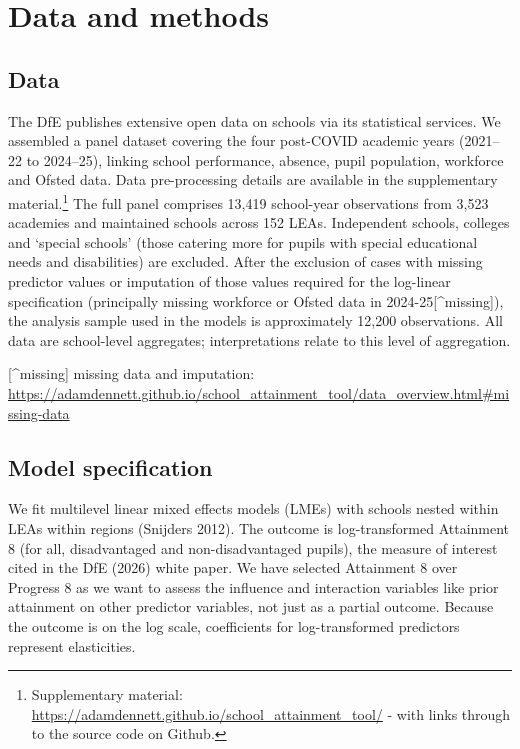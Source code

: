 \documentclass[
  12pt,
  titlepage]{article}
\begin{document}
\section{Data and methods}\label{data-and-methods}

\subsection{Data}\label{data}

The DfE publishes extensive open data on schools via its statistical
services. We assembled a panel dataset covering the four post-COVID
academic years (2021--22 to 2024--25), linking school performance,
absence, pupil population, workforce and Ofsted data. Data
pre-processing details are available in the supplementary
material.\footnote{Supplementary material:
  \url{https://adamdennett.github.io/school_attainment_tool/} - with
  links through to the source code on Github.} The full panel comprises
13,419 school-year observations from 3,523 academies and maintained
schools across 152 LEAs. Independent schools, colleges and `special
schools' (those catering more for pupils with special educational needs
and disabilities) are excluded. After the exclusion of cases with
missing predictor values or imputation of those values required for the
log-linear specification (principally missing workforce or Ofsted data
in 2024-25{[}\^{}missing{]}), the analysis sample used in the models is
approximately 12,200 observations. All data are school-level aggregates;
interpretations relate to this level of aggregation.

{[}\^{}missing{]} missing data and imputation:
\url{https://adamdennett.github.io/school_attainment_tool/data_overview.html\#missing-data}

\subsection{Model specification}\label{model-specification}

We fit multilevel linear mixed effects models (LMEs) with schools nested
within LEAs within regions (Snijders 2012). The outcome is
log-transformed Attainment 8 (for all, disadvantaged and
non-disadvantaged pupils), the measure of interest cited in the DfE
(2026) white paper. We have selected Attainment 8 over Progress 8 as we
want to assess the influence and interaction variables like prior
attainment on other predictor variables, not just as a partial outcome.
Because the outcome is on the log scale, coefficients for
log-transformed predictors represent elasticities.
\end{document}
